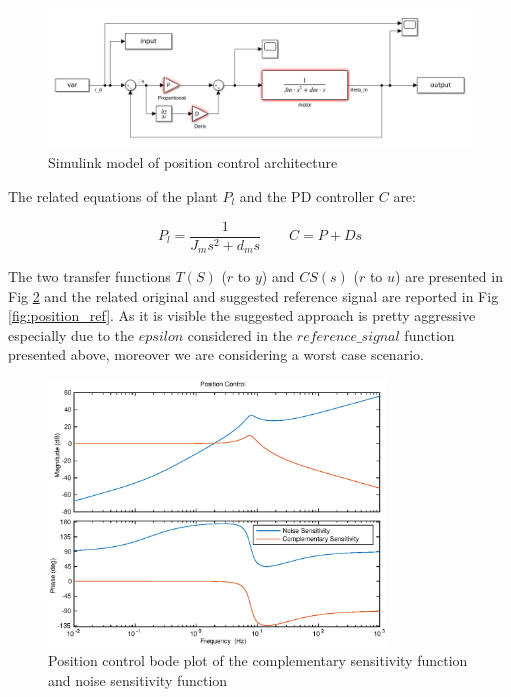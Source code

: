 \documentclass[a4paper,11pt]{article}
\begin{document}
\begin{figure}[H]
\begin{center}
\includegraphics[width=1\textwidth]{images/position.png}
\end{center}
\caption{Simulink model of position control architecture}
\label{fig:position_control}
\end{figure}

\bigskip
\noindent The related equations of the plant $P_l$ and the PD controller $C$ are:

\[
P_l = \frac{1}{J_m s^2 + d_m s} \qquad
C = P + Ds
\]

\bigskip
\noindent The two transfer functions $T(S)$ ($r$ to $y$) and $CS(s)$ ($r$ to $u$) are presented in Fig \ref{fig:position_tf} and the related original and suggested reference signal are reported in Fig \ref{fig:position_ref}. As it is visible the suggested approach is pretty aggressive especially due to the $epsilon$ considered in the $reference\_signal$ function presented above, moreover we are considering a worst case scenario.


\begin{figure}[H]
\begin{center}
\includegraphics[width=0.8\textwidth]{images/position_tf.eps}
\end{center}
\caption{Position control bode plot of the complementary sensitivity function and noise sensitivity function}
\label{fig:position_tf}
\end{figure}
\end{document}
